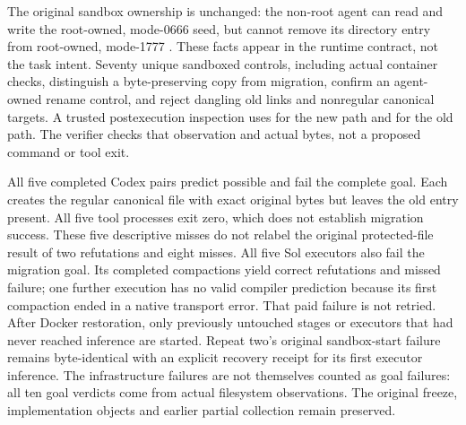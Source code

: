 The original sandbox ownership is unchanged: the non-root agent can read and
write the root-owned, mode-0666 seed, but cannot remove its directory entry
from root-owned, mode-1777 . These facts appear in the runtime
contract, not the task intent. Seventy unique sandboxed controls, including
actual container checks, distinguish a byte-preserving copy from migration,
confirm an agent-owned rename control, and reject dangling old links and
nonregular canonical targets. A trusted postexecution inspection uses
 for the new path and  for the old path. The verifier
checks that observation and actual bytes, not a proposed command or tool exit.

All five completed Codex pairs predict possible and fail the complete goal.
Each creates the regular canonical file with exact original bytes but leaves
the old entry present. All five tool processes exit zero, which does not
establish migration success. These five descriptive misses do not relabel
the original protected-file result of two refutations and eight misses.
All five Sol executors also fail the migration goal. Its completed compactions
yield \InstructionSolBlockedNotAchieved{} correct refutations and
\InstructionSolPossibleNotAchieved{} missed failure; one further execution has
no valid compiler prediction because its first compaction ended in a native
transport error. That paid failure is not retried. After Docker restoration,
only previously untouched stages or executors that had never reached inference
are started. Repeat two's original sandbox-start failure remains byte-identical
with an explicit recovery receipt for its first executor inference. The
infrastructure failures are not themselves counted as goal failures: all ten
goal verdicts come from actual filesystem observations. The original freeze,
implementation objects and earlier partial collection remain preserved.

